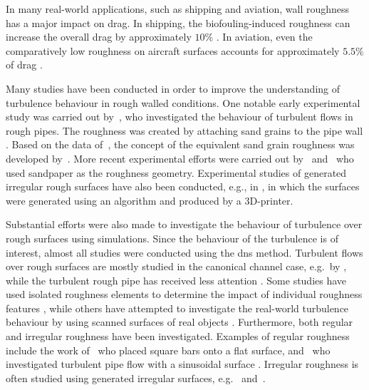 In many real-world applications,  such as shipping and aviation, wall roughness has a major impact on drag.
In shipping, the biofouling-induced roughness can increase the overall drag by approximately $10 \%$ \citep{flackReviewHydraulicRoughness2010}. 
In aviation, even the comparatively low roughness on aircraft surfaces accounts for approximately $5.5 \%$ of drag \citep{chungPredictingDragRough2021}. 

Many studies have been conducted in order to improve the understanding of turbulence behaviour in rough walled conditions.
One notable early experimental study was carried out by~\citeauthor{StroemungsgesetzeNikuradse}, who investigated the behaviour of turbulent flows in rough pipes.
The roughness was created by attaching sand grains  to the pipe wall \citep{StroemungsgesetzeNikuradse}. 
Based on  the data of~\citeauthor{StroemungsgesetzeNikuradse}, the concept of the equivalent sand grain roughness was developed by~\cite{schlichtingExperimentelleUntersuchungenRauhigkeitsproblem1936}.
More recent experimental efforts were carried out by~\cite{schultzRoughwallTurbulentBoundary2007a} and~\cite{frohnapfelFlowResistanceHeterogeneous2024} who used sandpaper as the roughness geometry.
Experimental studies of generated irregular rough surfaces have also been conducted, e.g., in \citep{flackSkinFrictionMeasurements2020}, in which the surfaces were generated using an algorithm and produced by a 3D-printer.


Substantial efforts were also made to investigate the behaviour of turbulence over rough surfaces using simulations.
Since the behaviour of the turbulence is of interest, almost all studies were conducted using the \acrshort{dns} method.
Turbulent flows over rough surfaces are mostly studied in the canonical channel case, e.g.\ by \citep{thakkarInvestigationTurbulentFlow2017,flackSkinFrictionMeasurements2020,kimTurbulenceStatisticsFully1987,jellyReynoldsDispersiveShear2018}, while the turbulent rough pipe has received less attention \citep{chanSystematicInvestigationRoughness2015,demaioDirectNumericalSimulation2023}.
Some studies have used isolated roughness elements to determine the impact of individual roughness features \citep{chatzikyriakouDNSTurbulentFlow2015}, while others have attempted to investigate the real-world turbulence behaviour by using scanned surfaces of real objects \citep{thakkarSurfaceCorrelationsHydrodynamic2017,flackSkinFrictionMeasurements2020,frohnapfelFlowResistanceHeterogeneous2024}.
Furthermore, both regular and irregular roughness have been investigated.
Examples of regular roughness include the work of~\citeauthor{leonardiStructureTurbulentChannel2004} who placed square bars onto a flat surface, and~\citeauthor{chanSystematicInvestigationRoughness2015} who investigated turbulent pipe flow with a sinusoidal surface \citep{chanSystematicInvestigationRoughness2015,chanSecondaryMotionTurbulent2018,leonardiStructureTurbulentChannel2004}.
Irregular roughness is often studied using generated irregular surfaces, e.g.\ \cite{thakkarInvestigationTurbulentFlow2017,busseReynoldsnumberDependenceNearwall2017} and~\cite{demaioDirectNumericalSimulation2023}.

